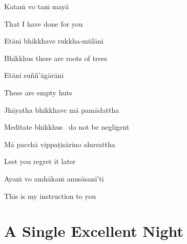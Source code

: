 \begin{verses}
  Kataṁ vo taṁ mayā
\end{verses}

\begin{english}
  That I have done for you
\end{english}

\begin{verses}
  Etāni bhikkhave rukkha-mūlāni
\end{verses}

\begin{english}
  Bhikkhus these are roots of trees
\end{english}

\begin{verses}
  Etāni suññ'āgārāni
\end{verses}

\begin{english}
  These are empty huts
\end{english}

\ifninebythirteen\clearpage\fi

\begin{verses}
  Jhāyatha bhikkhave mā pamādattha
\end{verses}

\begin{english}
  Meditate bhikkhus \breathmark\ do not be negligent
\end{english}

\begin{verses}
  Mā pacchā vippaṭisārino ahuvattha
\end{verses}

\begin{english}
  Lest you regret it later
\end{english}

\begin{verses}
  Ayaṁ vo amhākaṁ anusāsanī'ti
\end{verses}

\begin{english}
  This is my instruction to you
\end{english}

\suttaRef{[MN 19]}

\ifdigital{}\fi



\section{A Single Excellent Night}
\label{single-excellent-night}

